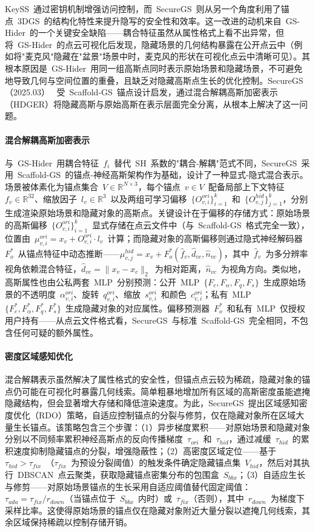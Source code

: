 KeySS~通过密钥机制增强访问控制，而~SecureGS~则从另一个角度利用了锚点~3DGS~的结构化特性来提升隐写的安全性和效率。这一改进的动机来自~GS-Hider~的一个关键安全缺陷——耦合特征虽然从属性格式上看不出异常，但将~GS-Hider~的点云可视化后发现，隐藏场景的几何结构暴露在公开点云中（例如将"麦克风"隐藏在"盆景"场景中时，麦克风的形状在可视化点云中清晰可见）。其根本原因是~GS-Hider~用同一组高斯点同时表示原始场景和隐藏场景，不可避免地导致几何与空间位置的重叠，且缺乏对隐藏高斯点生长的优化控制。SecureGS（2025.03）~\cite{2503_06118} 受~Scaffold-GS~锚点设计启发，通过混合解耦高斯加密表示（HDGER）将隐藏高斯与原始高斯在表示层面完全分离，从根本上解决了这一问题。

\paragraph{混合解耦高斯加密表示}与~GS-Hider~用耦合特征~$f_i$~替代~SH~系数的"耦合-解耦"范式不同，SecureGS~采用~Scaffold-GS~的锚点-神经高斯架构作为基础，设计了一种显式-隐式混合表示。场景被体素化为锚点集合~$V \in \mathbb{R}^{N \times 3}$，每个锚点~$v \in V$~配备局部上下文特征~$f_v \in \mathbb{R}^{32}$、缩放因子~$l_v \in \mathbb{R}^3$~以及两组可学习偏移~$\{O_{v,i}^{ori}\}_{i=1}^k$~和~$\{O_{v,j}^{hid}\}_{j=1}^k$，分别生成渲染原始场景和隐藏对象的高斯点。关键设计在于偏移的存储方式：原始场景的高斯偏移~$\{O_{v,i}^{ori}\}_{i=1}^k$~显式存储在点云文件中（与~Scaffold-GS~格式完全一致），位置由~$\mu_{v,i}^{ori} = x_v + O_{v,i}^{ori} \cdot l_v$~计算；而隐藏对象的高斯偏移则通过隐式神经解码器~$F_o^*$~从锚点特征中动态推断——$\mu_{v,j}^{hid} = x_v + F_o^*(\hat{f}_v, \hat{d}_{vc}, \hat{n}_{vc})$，其中~$\hat{f}_v$~为多分辨率视角依赖混合特征，$\hat{d}_{vc} = \|x_v - x_c\|_2$~为相对距离，$\hat{n}_{vc}$~为视角方向。类似地，高斯属性也由公私两套~MLP~分别预测：公开~MLP~$\{F_c, F_\alpha, F_q, F_s\}$~生成原始场景的不透明度~$\alpha_{v,i}^{ori}$、旋转~$q_{v,i}^{ori}$、缩放~$s_{v,i}^{ori}$~和颜色~$c_{v,i}^{ori}$；私有~MLP~$\{F_c^*, F_\alpha^*, F_q^*, F_s^*\}$~生成隐藏对象的对应属性。偏移预测器~$F_o^*$~和私有~MLP~仅授权用户持有——从点云文件格式看，SecureGS~与标准~Scaffold-GS~完全相同，不包含任何可疑的额外属性。

\paragraph{密度区域感知优化}混合解耦表示虽然解决了属性格式的安全性，但锚点点云较为稀疏，隐藏对象的锚点仍可能在可视化时暴露几何线索。简单粗暴地增加所有区域的高斯密度虽能遮掩隐藏结构，但会显著增大存储和降低渲染速度。为此，SecureGS~提出区域感知密度优化（RDO）策略，自适应控制锚点的分裂与修剪，仅在隐藏对象所在区域大量生长锚点。该策略包含三个步骤：（1）异步梯度累积——对原始场景和隐藏对象分别以不同频率累积神经高斯点的反向传播梯度~$\tau_{ori}$~和~$\tau_{hid}$，通过减缓~$\tau_{hid}$~的累积速度抑制隐藏锚点的分裂，增强隐蔽性；（2）高密度区域定位——基于~$\tau_{hid} > \tau_{fix}$~（$\tau_{fix}$~为预设分裂阈值）的触发条件确定隐藏锚点集~$V_{hid}$，然后对其执行~DBSCAN~点云聚类，获取隐藏锚点密集分布的包围盒~$S_{bbx}$；（3）自适应生长与修剪——对原始场景锚点的生长采用自适应阈值替代固定阈值：$\tau_{ada} = \tau_{fix} / r_{down}$（当锚点位于~$S_{bbx}$~内时）或~$\tau_{fix}$（否则），其中~$r_{down}$~为梯度下采样比率。这使得原始场景的锚点仅在隐藏对象附近大量分裂以遮掩几何线索，其余区域保持稀疏以控制存储开销。

